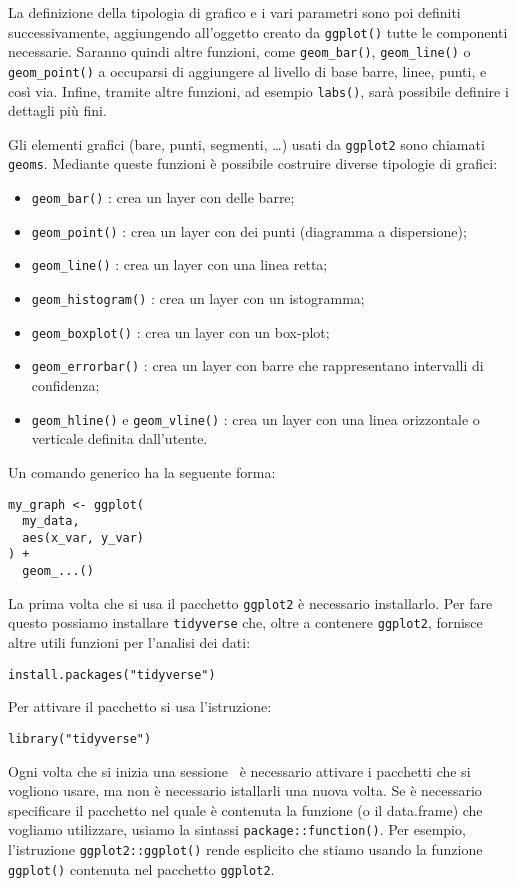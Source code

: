 La definizione della tipologia di grafico e i vari parametri sono poi definiti successivamente, aggiungendo all'oggetto creato da \verb+ggplot()+ tutte le componenti necessarie. 
Saranno quindi altre funzioni, come \verb+geom_bar()+, \verb+geom_line()+ o \verb+geom_point()+ a occuparsi di aggiungere al livello di base barre, linee, punti, e così via. 
Infine, tramite altre funzioni, ad esempio \verb+labs()+, sarà possibile definire i dettagli più fini.

Gli elementi grafici (bare, punti, segmenti, \dots) usati da \verb+ggplot2+ sono chiamati \verb+geoms+. Mediante queste funzioni è possibile costruire diverse tipologie di grafici:
\begin{itemize}
\item \verb+geom_bar()+ : crea un layer con delle barre;
\item \verb+geom_point()+ : crea un layer con dei punti (diagramma a dispersione);
\item \verb+geom_line()+ : crea un layer con una linea retta;
\item \verb+geom_histogram()+ : crea un layer con un istogramma;
\item \verb+geom_boxplot()+ : crea un layer con un box-plot;
\item \verb+geom_errorbar()+ : crea un layer con barre che rappresentano intervalli di confidenza;
\item \verb+geom_hline()+ e \verb+geom_vline()+ : crea un layer con una linea orizzontale o verticale definita dall'utente.
\end{itemize}
Un comando generico ha la seguente forma:
\begin{lstlisting}
my_graph <- ggplot(
  my_data,
  aes(x_var, y_var)
) +
  geom_...()
\end{lstlisting}

La prima volta che si usa il pacchetto \verb+ggplot2+ è necessario installarlo. Per fare questo possiamo installare \verb+tidyverse+ che, oltre a contenere  \verb+ggplot2+, fornisce altre utili funzioni per l'analisi dei dati:
\begin{lstlisting}
install.packages("tidyverse")
\end{lstlisting}
Per attivare il pacchetto si usa l'istruzione:
\begin{lstlisting}
library("tidyverse")
\end{lstlisting}
Ogni volta che si inizia una sessione \R\, è necessario attivare i pacchetti che si vogliono usare, ma non è necessario istallarli una nuova volta. 
Se è necessario specificare il pacchetto nel quale è contenuta la funzione (o il data.frame) che vogliamo utilizzare, usiamo la sintassi \verb+package::function()+. Per esempio, l'istruzione \verb+ggplot2::ggplot()+ rende esplicito che stiamo usando la funzione \verb+ggplot()+ contenuta nel pacchetto \verb+ggplot2+.

